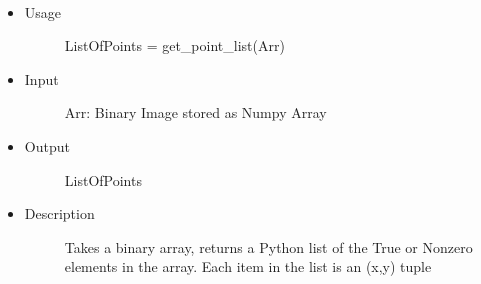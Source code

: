 \documentclass[letterpaper,10pt,oneside]{sphinxmanual}
\begin{document}

\begin{fulllineitems}
\label{index:libcelegans.get_point_list}~\begin{itemize}
\item {} \begin{description}
\item[{Usage}] \leavevmode
ListOfPoints = get\_point\_list(Arr)

\end{description}

\item {} \begin{description}
\item[{Input}] \leavevmode
Arr: Binary Image stored as Numpy Array

\end{description}

\item {} \begin{description}
\item[{Output}] \leavevmode
ListOfPoints

\end{description}

\item {} \begin{description}
\item[{Description}] \leavevmode
Takes a binary array, returns a Python list of the True or Nonzero
elements in the array.  Each item in the list is an (x,y) tuple

\end{description}

\end{itemize}

\end{fulllineitems}

\end{document}
